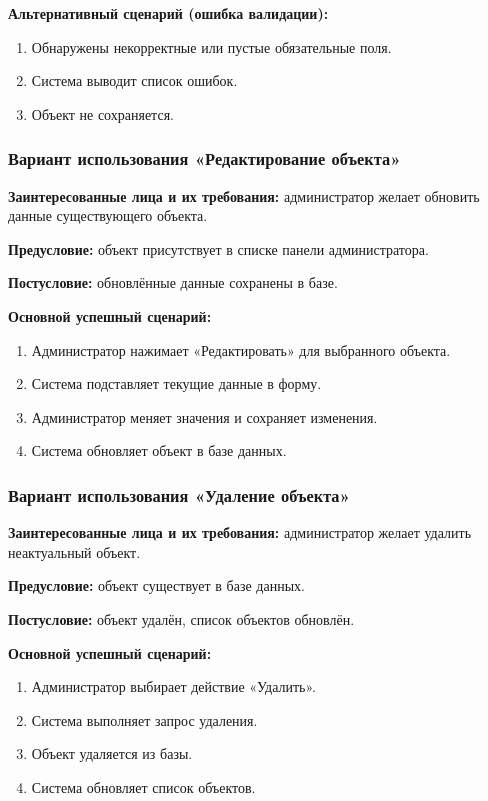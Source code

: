 \textbf{Альтернативный сценарий (ошибка валидации):} 
\begin{enumerate}
	\item Обнаружены некорректные или пустые обязательные поля.
	\item Система выводит список ошибок.
	\item Объект не сохраняется.
\end{enumerate}

\subsubsection{Вариант использования «Редактирование объекта»}
\textbf{Заинтересованные лица и их требования:} администратор желает обновить данные существующего объекта.

\textbf{Предусловие:} объект присутствует в списке панели администратора.

\textbf{Постусловие:} обновлённые данные сохранены в базе.

\textbf{Основной успешный сценарий:}
\begin{enumerate}
	\item Администратор нажимает «Редактировать» для выбранного объекта.
	\item Система подставляет текущие данные в форму.
	\item Администратор меняет значения и сохраняет изменения.
	\item Система обновляет объект в базе данных.
\end{enumerate}

\subsubsection{Вариант использования «Удаление объекта»}
\textbf{Заинтересованные лица и их требования:} администратор желает удалить неактуальный объект.

\textbf{Предусловие:} объект существует в базе данных.

\textbf{Постусловие:} объект удалён, список объектов обновлён.

\textbf{Основной успешный сценарий:}
\begin{enumerate}
	\item Администратор выбирает действие «Удалить».
	\item Система выполняет запрос удаления.
	\item Объект удаляется из базы.
	\item Система обновляет список объектов.
\end{enumerate}

